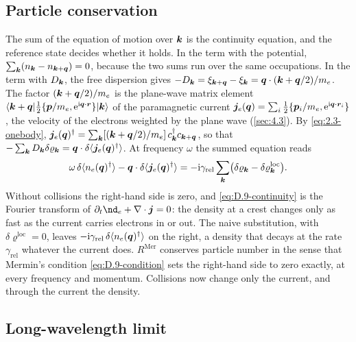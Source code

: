 \subsection*{Particle conservation}

The sum of the equation of motion over $\bm{k}$ is the continuity equation, and the reference state decides whether it holds. In the term with the potential, $\sum_{\bm{k}}(n_{\bm{k}} - n_{\bm{k}+\bm{q}}) = 0$, because the two sums run over the same occupations. In the term with $D_{\bm{k}}$, the free dispersion gives $-D_{\bm{k}} = \xi_{\bm{k}+\bm{q}} - \xi_{\bm{k}} = \bm{q}\cdot(\bm{k} + \bm{q}/2)/m_e$. The factor $(\bm{k} + \bm{q}/2)/m_e$ is the plane-wave matrix element $\langle\bm{k} + \bm{q}|\tfrac12\{\bm{p}/m_e, \mathrm{e}^{\mathrm{i}\bm{q}\cdot\bm{r}}\}|\bm{k}\rangle$ of the paramagnetic current $\bm{j}_e(\bm{q}) = \sum_i\tfrac12\{\bm{p}_i/m_e, \mathrm{e}^{\mathrm{i}\bm{q}\cdot\bm{r}_i}\}$, the velocity of the electrons weighted by the plane wave (\cref{sec:4.3}). By \cref{eq:2.3-onebody}, $\bm{j}_e(\bm{q})^\dagger = \sum_{\bm{k}}[(\bm{k} + \bm{q}/2)/m_e]\,c^\dagger_{\bm{k}}c_{\bm{k}+\bm{q}}$, so that $-\sum_{\bm{k}}D_{\bm{k}}\delta\varrho_{\bm{k}} = \bm{q}\cdot\delta\langle\bm{j}_e(\bm{q})^\dagger\rangle$. At frequency $\omega$ the summed equation reads
\begin{equation}
  \omega\,\delta\langle n_e(\bm{q})^\dagger\rangle - \bm{q}\cdot\delta\langle\bm{j}_e(\bm{q})^\dagger\rangle = -\mathrm{i}\gamma_{\mathrm{rel}}\sum_{\bm{k}}\bigl(\delta\varrho_{\bm{k}} - \delta\varrho^{\mathrm{loc}}_{\bm{k}}\bigr) .
  \label{eq:D.9-continuity}
\end{equation}
Without collisions the right-hand side is zero, and \cref{eq:D.9-continuity} is the Fourier transform of $\partial_t\nd_e + \nabla\cdot\vect{j} = 0$: the density at a crest changes only as fast as the current carries electrons in or out. The naive substitution, with $\delta\varrho^{\mathrm{loc}} = 0$, leaves $-\mathrm{i}\gamma_{\mathrm{rel}}\,\delta\langle n_e(\bm{q})^\dagger\rangle$ on the right, a density that decays at the rate $\gamma_{\mathrm{rel}}$ whatever the current does. $R^{\mathrm{Mer}}$ conserves particle number in the sense that Mermin's condition \cref{eq:D.9-condition} sets the right-hand side to zero exactly, at every frequency and momentum. Collisions now change only the current, and through the current the density.

\subsection*{Long-wavelength limit}

